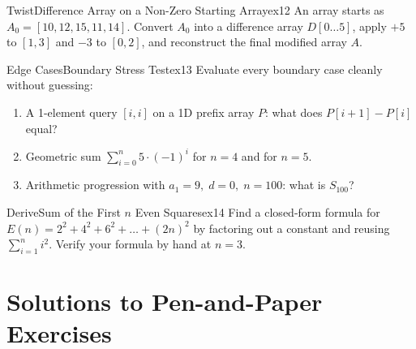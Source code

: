\documentclass[11pt,a4paper]{article}
\theoremstyle{definition}
\begin{document}
\begin{tryitbox}{Twist}{Difference Array on a Non-Zero Starting Array}{ex12}
An array starts as $A_0 = [10, 12, 15, 11, 14]$. Convert $A_0$ into a difference array $D[0 \dots 5]$, apply $+5$ to $[1, 3]$ and $-3$ to $[0, 2]$, and reconstruct the final modified array $A$.
\end{tryitbox}

\begin{tryitbox}{Edge Cases}{Boundary Stress Test}{ex13}
Evaluate every boundary case cleanly without guessing:
\begin{enumerate}
    \item A 1-element query $[i, i]$ on a 1D prefix array $P$: what does $P[i + 1] - P[i]$ equal?
    \item Geometric sum $\sum_{i=0}^{n} 5 \cdot (-1)^i$ for $n = 4$ and for $n = 5$.
    \item Arithmetic progression with $a_1 = 9,\; d = 0,\; n = 100$: what is $S_{100}$?
\end{enumerate}
\end{tryitbox}

\begin{tryitbox}{Derive}{Sum of the First $n$ Even Squares}{ex14}
Find a closed-form formula for $E(n) = 2^2 + 4^2 + 6^2 + \dots + (2n)^2$ by factoring out a constant and reusing $\sum_{i=1}^{n} i^2$. Verify your formula by hand at $n = 3$.
\end{tryitbox}

\section*{Solutions to Pen-and-Paper Exercises}
\end{document}
